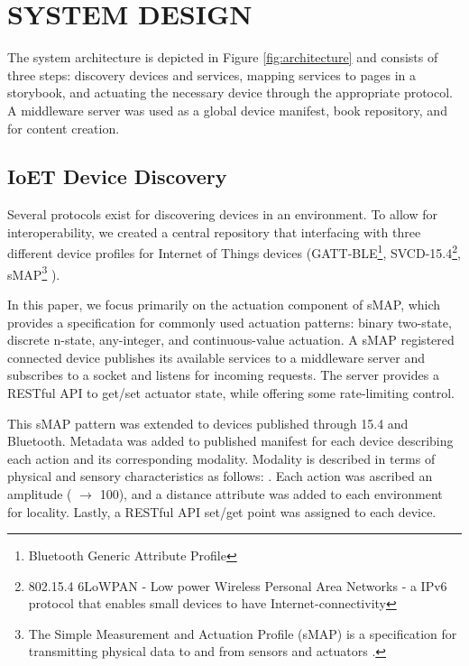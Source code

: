 \documentclass{sigchi}
\newcommand*{\quoted}[1]{{\small{\fontfamily{cmss}\selectfont{#1}}}}
\begin{document}


\section{SYSTEM DESIGN}
The system architecture is depicted in Figure \ref{fig:architecture} and consists of three steps: discovery devices and services, mapping services to pages in a storybook, and actuating the necessary device through the appropriate protocol. 
A middleware server was used as a global device manifest, book repository, and for content creation. 



\subsection{IoET Device Discovery} 
Several protocols exist for discovering devices in an environment. To allow for interoperability, we created a central repository that interfacing with three different device profiles for Internet of Things devices (GATT-BLE\footnote{Bluetooth Generic Attribute Profile}, SVCD-15.4\footnote{802.15.4 6LoWPAN - Low power Wireless Personal Area Networks - a IPv6 protocol that enables small devices to have Internet-connectivity}, sMAP\footnote{The Simple Measurement and Actuation Profile (sMAP) is a specification for transmitting physical data to and from sensors and actuators \cite{dawson-haggerty_smap:_2010}.} ).

In this paper, we focus primarily on the actuation component of sMAP, which provides a specification for commonly used actuation patterns: binary two-state, discrete n-state, any-integer, and continuous-value actuation. A sMAP registered connected device publishes its available services to a middleware server and subscribes to a socket and listens for incoming requests. The server provides a RESTful API to get/set actuator state, while offering some rate-limiting control. 

This sMAP pattern was extended to devices published through 15.4 and Bluetooth. 
Metadata was added to published manifest for each device describing each action and its corresponding modality. 
Modality is described in terms of physical and sensory characteristics as follows: \quoted{$\langle$ light, air, sound, smell, heat, taste, motion $\rangle$}.
Each action was ascribed an amplitude (\quoted{on} $\rightarrow$ 100), and a distance attribute was added to each environment for locality. Lastly, a RESTful API set/get point was assigned to each device.
\end{document}
